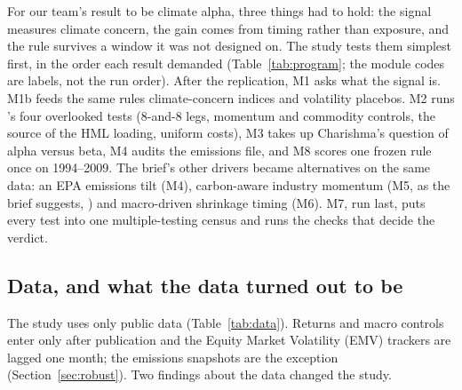 For our team's result to be climate alpha, three things had to hold: the signal measures climate concern, the gain comes from timing rather than exposure, and the rule survives a window it was not designed on. The study tests them simplest first, in the order each result demanded (Table~\ref{tab:program}; the module codes are labels, not the run order). After the replication, M1 asks what the signal is. M1b feeds the same rules climate-concern indices and volatility placebos. M2 runs \CR's four overlooked tests (8-and-8 legs, momentum and commodity controls, the source of the HML loading, uniform costs), M3 takes up Charishma's question of alpha versus beta, M4 audits the emissions file, and M8 scores one frozen rule once on 1994--2009. The brief's other drivers became alternatives on the same data: an EPA emissions tilt (M4), carbon-aware industry momentum (M5, as the brief suggests, \citealp{za2024}) and macro-driven shrinkage timing (M6). M7, run last, puts every test into one multiple-testing census and runs the checks that decide the verdict.

\subsection{Data, and what the data turned out to be}
\label{sec:data}

The study uses only public data (Table~\ref{tab:data}). Returns and macro controls enter only after publication and the Equity Market Volatility (EMV) trackers are lagged one month; the emissions snapshots are the exception (Section~\ref{sec:robust}). Two findings about the data changed the study.

